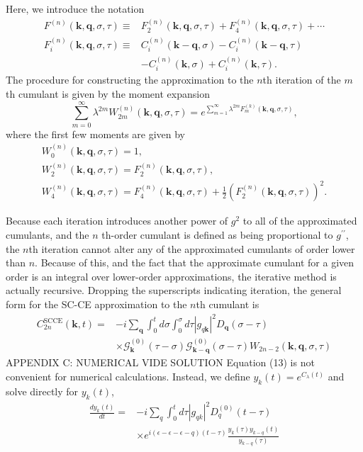 Here, we introduce the notation
$$
\begin{aligned}
F^{(n)}(\mathbf{k}, \mathbf{q}, \sigma, \tau) \equiv & F_2^{(n)}(\mathbf{k}, \mathbf{q}, \sigma, \tau)+F_4^{(n)}(\mathbf{k}, \mathbf{q}, \sigma, \tau)+\cdots \\
F_i^{(n)}(\mathbf{k}, \mathbf{q}, \sigma, \tau) \equiv & C_i^{(n)}(\mathbf{k}-\mathbf{q}, \sigma)-C_i^{(n)}(\mathbf{k}-\mathbf{q}, \tau) \\
& -C_i^{(n)}(\mathbf{k}, \sigma)+C_i^{(n)}(\mathbf{k}, \tau) .
\end{aligned}
$$
The procedure for constructing the approximation to the $n$th iteration of the $m$ th cumulant is given by the moment expansion
$$
\sum_{m=0}^{\infty} \lambda^{2 m} W_{2 m}^{(n)}(\mathbf{k}, \mathbf{q}, \sigma, \tau)=e^{\sum_{m=1}^{\infty} \lambda^{2 m} F_m^{(k)}(\mathbf{k}, \mathbf{q}, \sigma, \tau)},
$$
where the first few moments are given by
$$
\begin{gathered}
W_0^{(n)}(\mathbf{k}, \mathbf{q}, \sigma, \tau)=1, \\
W_2^{(n)}(\mathbf{k}, \mathbf{q}, \sigma, \tau)=F_2^{(n)}(\mathbf{k}, \mathbf{q}, \sigma, \tau), \\
W_4^{(n)}(\mathbf{k}, \mathbf{q}, \sigma, \tau)=F_4^{(n)}(\mathbf{k}, \mathbf{q}, \sigma, \tau)+\frac{1}{2}\left(F_2^{(n)}(\mathbf{k}, \mathbf{q}, \sigma, \tau)\right)^2 .
\end{gathered}
$$

Because each iteration introduces another power of $g^2$ to all of the approximated cumulants, and the $n$ th-order cumulant is defined as being proportional to $g^{\prime \prime}$, the $n$th iteration cannot alter any of the approximated cumulants of order lower than $n$. Because of this, and the fact that the approximate cumulant for a given order is an integral over lower-order approximations, the iterative method is actually recursive. Dropping the superscripts indicating iteration, the general form for the SC-CE approximation to the $n$th cumulant is
$$
\begin{aligned}
C_{2 n}^{\mathrm{SCCE}}(\mathbf{k}, t)= & -i \sum_{\mathbf{q}} \int_0^t d \sigma \int_0^\sigma d \tau\left|g_{q \mathbf{k}}\right|^2 D_{\mathbf{q}}(\sigma-\tau) \\
& \times \mathcal{G}_{\mathbf{k}}^{(0)}(\tau-\sigma) \mathcal{G}_{\mathbf{k}-\mathbf{q}}^{(0)}(\sigma-\tau) W_{2 n-2}(\mathbf{k}, \mathbf{q}, \sigma, \tau)
\end{aligned}
$$
APPENDIX C: NUMERICAL VIDE SOLUTION
Equation (13) is not convenient for numerical calculations. Instead, we define $y_k(t)=e^{C_\lambda(t)}$ and solve directly for $y_k(t)$,
$$
\begin{aligned}
\frac{d y_k(t)}{d t}= & -i \sum_q \int_0^t d \tau\left|g_{q k}\right|^2 D_q^{(0)}(t-\tau) \\
& \times e^{i(\epsilon-\epsilon-\epsilon-q)(t-\tau)} \frac{y_k(\tau) y_{k-q}(t)}{y_{k-q}(\tau)}
\end{aligned}
$$

